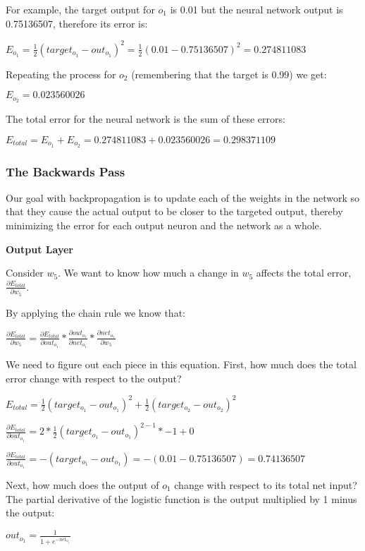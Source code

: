 \documentclass[a4paper]{article}
\begin{document}
\bigskip For example, the target output for $o_1$ is 0.01 but the neural network output is 0.75136507, therefore its error is:

$E_{o_1}=\frac{1}{2}(target_{o_1}-out_{o_1})^2=\frac{1}{2}(0.01-0.75136507)^2=0.274811083$

\bigskip
Repeating the process for $o_2$ (remembering that the target is 0.99) we get:

$E_{o_2}=0.023560026$

The total error for the neural network is the sum of these errors:

$E_{total}=E_{o_1}+E_{o_2}=0.274811083+0.023560026=0.298371109$

\subsubsection{The Backwards Pass}
Our goal with backpropagation is to update each of the weights in the network so that they cause the actual output to be closer to the targeted output, thereby minimizing the error for each output neuron and the network as a whole.

\bigskip
\textbf{Output Layer}

Consider $w_5$. We want to know how much a change in $w_5$ affects the total error, $\frac{\partial E_{total}}{\partial w_5}$.

By applying the chain rule we know that:

$\frac{\partial E_{total}}{\partial w_5}=\frac{\partial E_{total}}{\partial out_{o_1}}*\frac{\partial out_{o_1}}{\partial net_{o_1}}*\frac{\partial net_{o_1}}{\partial w_5}$ 

We need to figure out each piece in this equation. First, how much does the total error change with respect to the output?

$E_{total} = \frac{1}{2}(target_{o_1}-out_{o_1})^2 + \frac{1}{2}(target_{o_2}-out_{o_2})^2$

$\frac{\partial E_{total}}{\partial out_{o_1}} = 2*\frac{1}{2}(target_{o_1}-out_{o_1})^{2-1}*-1+0$

$\frac{\partial E_{total}}{\partial out_{o_1}} = -(target_{o_1}-out_{o_1})=-(0.01-0.75136507)=0.74136507$

\bigskip
Next, how much does the output of $o_1$ change with respect to its total net input? The partial derivative of the logistic function is the output multiplied by 1 minus the output:

$out_{o_1}=\frac{1}{1+e^{-net_{o_1}}}$
\end{document}
